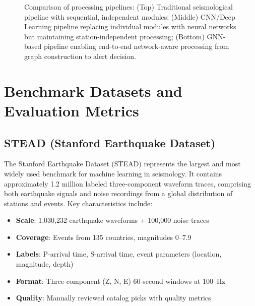 \documentclass[review,authoryear]{elsarticle}
\begin{document}
\begin{figure}[htbp]
\caption{Comparison of processing pipelines: (Top) Traditional seismological pipeline with sequential, independent modules; (Middle) CNN/Deep Learning pipeline replacing individual modules with neural networks but maintaining station-independent processing; (Bottom) GNN-based pipeline enabling end-to-end network-aware processing from graph construction to alert decision.}
\label{fig:pipeline_comparison}
\end{figure}


\section{Benchmark Datasets and Evaluation Metrics}
\label{sec:benchmarks}

\subsection{STEAD (Stanford Earthquake Dataset)}

The Stanford Earthquake Dataset (STEAD) \citep{mousavi2019stanford} represents the largest and most widely used benchmark for machine learning in seismology. It contains approximately 1.2 million labeled three-component waveform traces, comprising both earthquake signals and noise recordings from a global distribution of stations and events. Key characteristics include:

\begin{itemize}
  \item \textbf{Scale}: 1,030,232 earthquake waveforms + 100,000 noise traces
  \item \textbf{Coverage}: Events from 135 countries, magnitudes 0--7.9
  \item \textbf{Labels}: P-arrival time, S-arrival time, event parameters (location, magnitude, depth)
  \item \textbf{Format}: Three-component (Z, N, E) 60-second windows at 100~Hz
  \item \textbf{Quality}: Manually reviewed catalog picks with quality metrics
\end{itemize}
\end{document}

